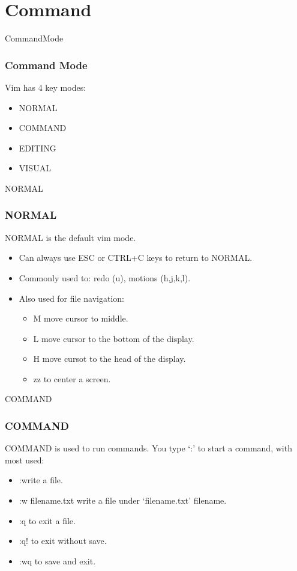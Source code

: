 \documentclass{beamer}
\begin{document}
\section{Command}
\begin{frame}{CommandMode}
    \frametitle{Command Mode}
    Vim has 4 key modes:
    \begin{itemize}
        \item NORMAL
        \item COMMAND
        \item EDITING
        \item VISUAL
    \end{itemize}
\end{frame}

\begin{frame}{NORMAL}
    \frametitle{NORMAL}
    NORMAL is the default vim mode.
    \begin{itemize}
        \item Can always use ESC or CTRL+C keys to return to NORMAL.
        \item Commonly used to: redo (u), motions (h,j,k,l).
        \item Also used for file navigation:
            \begin{itemize}
                \item \textsf{M} move cursor to middle.
                \item \textsf{L} move cursor to the bottom of the display.
                \item \textsf{H} move cursot to the head of the display.
                \item \textsf{zz} to center a screen.
            \end{itemize}
    \end{itemize}
\end{frame}

\begin{frame}{COMMAND}
    \frametitle{COMMAND}
    COMMAND is used to run commands.
    You type `:' to start a command, with most used:
    \begin{itemize}
        \item \textsf{:w}rite a file.
        \item \textsf{:w filename.txt} write a file under `filename.txt' filename.
        \item \textsf{:q} to exit a file.
        \item \textsf{:q!} to exit without save.
        \item \textsf{:wq} to save and exit.
    \end{itemize}
\end{frame}
\end{document}
